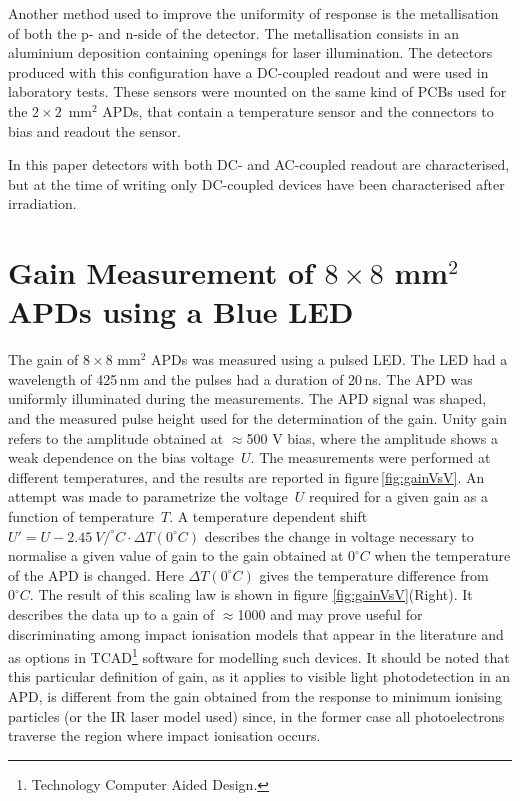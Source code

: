 \documentclass[3p,preprint,twocolumn]{elsarticle}
\begin{document}
Another method used to improve the uniformity of response is the metallisation of both the p- and n-side of the detector.
The metallisation consists in an aluminium deposition containing openings for laser illumination.
The detectors produced with this configuration have a DC-coupled readout and were used in laboratory tests.
These sensors were mounted on the same kind of PCBs used for the $2 \times 2$~mm$^2$ APDs, that contain a temperature sensor and the connectors to bias and readout the sensor.

In this paper detectors with both DC- and AC-coupled readout are characterised, but at the time of writing only DC-coupled devices have been characterised after irradiation. 

\section{Gain Measurement of $8 \times 8$ mm$^2$ APDs using a Blue LED}
\label{sec:gain8x8led}

The gain of $8 \times 8$ mm$^2$ APDs was measured using a pulsed LED.
The LED had a wavelength of 425\,nm and the pulses had a duration of 20\,ns.
The APD was uniformly illuminated during the measurements.
The APD signal was shaped, and the measured pulse height used for the determination of the gain.
Unity gain refers to the amplitude obtained at $\approx$500 V bias, where the amplitude shows a weak dependence on the bias voltage~$U$.
The measurements were performed at different temperatures, and the results are reported in figure\,\ref{fig:gainVsV}.
An attempt was made to parametrize the  voltage~$U$ required for a given gain as a function of temperature~$T$.
A temperature dependent shift $U' = U -2.45~ V/^\circ C \cdot \Delta T( 0^\circ C)$ describes the change in voltage necessary to normalise a given value of gain to the gain obtained at $0^\circ C$ when the temperature of the APD is changed.
Here $\Delta T( 0^\circ C)$ gives the temperature difference from $0^\circ C$. 
The result of this scaling law is shown in figure \ref{fig:gainVsV}(Right).
It describes the data up to a gain of $\approx$1000 and may prove useful for discriminating among impact ionisation models that appear in the literature and as options in TCAD\footnote{Technology Computer Aided Design.} software for modelling such devices.
It should be noted that this particular definition of gain, as it applies to visible light photodetection in an APD, is different from the gain obtained from the response to minimum ionising particles (or the IR laser model used) since, in the former case all photoelectrons traverse the region where impact ionisation occurs.
\end{document}
